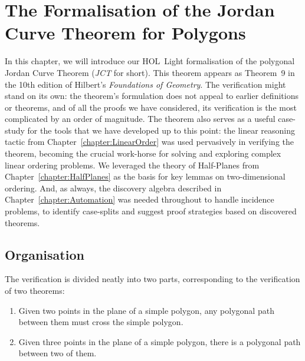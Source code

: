 \chapter{The Formalisation of the Jordan Curve Theorem for Polygons}\label{chapter:JordanFormalisation}

In this chapter, we will introduce our HOL~Light formalisation of the polygonal Jordan Curve Theorem (\emph{JCT} for short). This theorem appears as Theorem~9 in the 10th edition of Hilbert's \emph{Foundations of Geometry}. The verification might stand on its own: the theorem's formulation does not appeal to earlier definitions or theorems, and of all the proofs we have considered, its verification is the most complicated by an order of magnitude. The theorem also serves as a useful case-study for the tools that we have developed up to this point: the linear reasoning tactic from Chapter~\ref{chapter:LinearOrder} was used pervasively in verifying the theorem, becoming the crucial work-horse for solving and exploring complex linear ordering problems. We leveraged the theory of Half-Planes from Chapter~\ref{chapter:HalfPlanes} as the basis for key lemmas on two-dimensional ordering. And, as always, the discovery algebra described in Chapter~\ref{chapter:Automation} was needed throughout to handle incidence problems, to identify case-splits and suggest proof strategies based on discovered theorems. 

\section{Organisation}
The verification is divided neatly into two parts, corresponding to the verification of two theorems:
\begin{enumerate}
  \item Given two points in the plane of a simple polygon, any polygonal path between them must cross the simple polygon.
  \item Given three points in the plane of a simple polygon, there is a polygonal path between two of them.
\end{enumerate}

